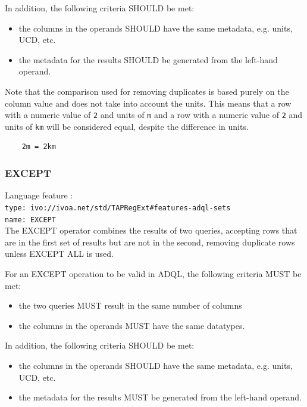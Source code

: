 \documentclass[11pt,a4paper]{ivoa}
\begin{document}
In addition, the following criteria SHOULD be met: 
\begin{itemize}
    \item the columns in the operands SHOULD have the same metadata, e.g. units, UCD, etc.
    \item the metadata for the results SHOULD be generated from the left-hand operand.
\end{itemize}

Note that the comparison used for removing duplicates is based purely on the
column value and does not take into account the units.
This means that a row with a numeric value of \verb:2: and units of \verb:m:
and a row with a numeric value of \verb:2: and units of \verb:km: will be
considered equal, despite the difference in units.
\begin{verbatim}
    2m = 2km
\end{verbatim}

\subsubsection{EXCEPT}
{\footnotesize Language feature :}\\
{\footnotesize \verb|type: ivo://ivoa.net/std/TAPRegExt#features-adql-sets|}\\
{\footnotesize \verb|name: EXCEPT|}\\

The EXCEPT operator combines the results of two queries, accepting rows that are
in the first set of results but are not in the second,
removing duplicate rows unless EXCEPT ALL is used.

For an EXCEPT operation to be valid in ADQL, the following criteria MUST be met:

\begin{itemize}
    \item the two queries MUST result in the same number of columns
    \item the columns in the operands MUST have the same datatypes.
\end{itemize}

In addition, the following criteria SHOULD be met: 
\begin{itemize}
    \item the columns in the operands SHOULD have the same metadata, e.g. units, UCD, etc.
    \item the metadata for the results MUST be generated from the left-hand operand.
\end{itemize}
\end{document}
